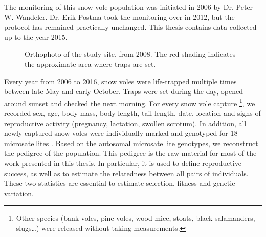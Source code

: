 The monitoring of this snow vole population was initiated in 2006 by Dr. Peter W. Wandeler. Dr. Erik Postma took the monitoring over in 2012, but the protocol has remained practically unchanged. This thesis contains data collected up to the year 2015.
\begin{figure}[ht]
	\caption{Orthophoto of the study site, from 2008. The red shading indicates the approximate area where traps are set.}
	\label{fig:fieldarea}
\end{figure}
Every year from 2006 to 2016, snow voles were life-trapped multiple times between late May and early October. Traps were set during the day, opened around sunset and checked the next morning. 
For every snow vole capture \footnote{Other species (bank voles, pine voles, wood mice, stoats, black salamanders, slugs\dots) were released without taking measurements.}, we recorded sex, age, body mass, body length, tail length, date, location and signs of reproductive activity (pregnancy, lactation, swollen scrotum). 
In addition, all newly-captured snow voles were individually marked and genotyped for 18 microsatellites \parencite{Wandeler2008}. Based on the autosomal microsatellite genotypes, we reconstruct the pedigree of the population. This pedigree is the raw material for most of the work presented in this thesis. In particular, it is used to define reproductive success, as well as to estimate the relatedness between all pairs of individuals. These two statistics are essential to estimate selection, fitness and genetic variation. 


